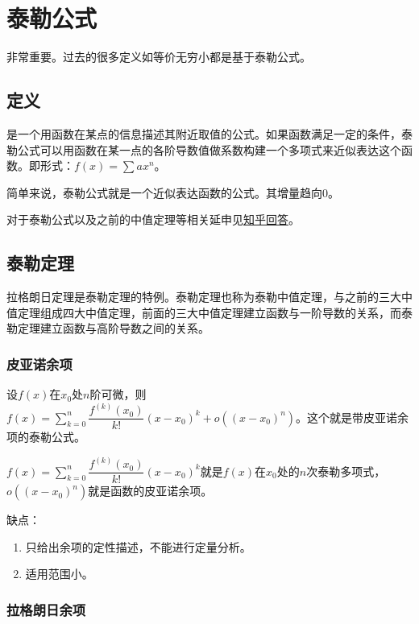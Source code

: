 \documentclass[UTF8, 12pt]{ctexart}
\begin{document}
\section{泰勒公式}

非常重要。过去的很多定义如等价无穷小都是基于泰勒公式。

\subsection{定义}

是一个用函数在某点的信息描述其附近取值的公式。如果函数满足一定的条件，泰勒公式可以用函数在某一点的各阶导数值做系数构建一个多项式来近似表达这个函数。即形式：$f(x)=\sum ax^n$。

简单来说，泰勒公式就是一个近似表达函数的公式。其增量趋向0。

对于泰勒公式以及之前的中值定理等相关延申见\href{https://www.zhihu.com/question/25627482}{知乎回答}。

\subsection{泰勒定理}

拉格朗日定理是泰勒定理的特例。泰勒定理也称为泰勒中值定理，与之前的三大中值定理组成四大中值定理，前面的三大中值定理建立函数与一阶导数的关系，而泰勒定理建立函数与高阶导数之间的关系。

\subsubsection{皮亚诺余项}

设$f(x)$在$x_0$处$n$阶可微，则$f(x)=\sum\limits_{k=0}^n\dfrac{f^{(k)}(x_0)}{k!}(x-x_0)^k+o((x-x_0)^n)$。这个就是带皮亚诺余项的泰勒公式。\medskip

$f(x)=\sum\limits_{k=0}^n\dfrac{f^{(k)}(x_0)}{k!}(x-x_0)^k$就是$f(x)$在$x_0$处的$n$次泰勒多项式，$o((x-x_0)^n)$就是函数的皮亚诺余项。

缺点：

\begin{enumerate}
    \item 只给出余项的定性描述，不能进行定量分析。
    \item 适用范围小。
\end{enumerate}

\subsubsection{拉格朗日余项}
\end{document}

